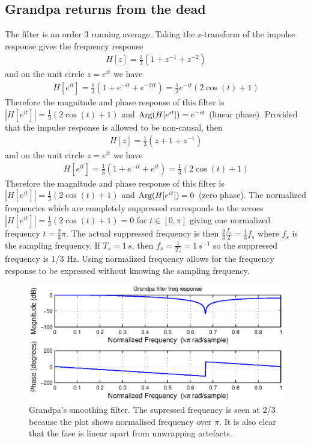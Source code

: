 \subsection{Grandpa returns from the dead}
The filter is an order 3 running average. Taking the z-transform of the impulse response gives the frequency response 
\begin{align*}
H[z] = \frac{1}{3}(1 + z^{-1} + z^{-2})
\end{align*}
and on the unit circle $z = e^{it}$ we have
\begin{align*}
H[e^{it}] = \frac{1}{3}(1 + e^{-it} + e^{-2it})=\frac{1}{3} e^{-it}(2\cos(t)+1)
\end{align*}
Therefore the magnitude and phase response of this filter is $|H[e^{it}]| = \frac{1}{3}(2\cos(t)+1)$ and $\textnormal{Arg}(H[e^{it}]) = e^{-it}$ (linear phase).
Provided that the impulse response is allowed to be non-causal, then
\begin{align*}
H[z] = \frac{1}{3}(z + 1 + z^{-1})
\end{align*}
and on the unit circle $z = e^{it}$ we have
\begin{align*}
H[e^{it}] = \frac{1}{3}(1 + e^{-it} + e^{it}) = \frac{1}{3}(2\cos(t)+1)
\end{align*}
Therefore the magnitude and phase response of this filter is $|H[e^{it}]| = \frac{1}{3}(2\cos(t)+1)$ and $\textnormal{Arg}(H[e^{it}]) = 0$ (zero phase). The normalized frequencies which are completely suppressed corresponds to the zeroes $|H[e^{it}]| = \frac{1}{3}(2\cos(t)+1) = 0$ for $t\in [0, \pi]$ giving one normalized frequency $t = \frac{2}{3}\pi$. The actual suppressed frequency is then $\frac{2}{3} \frac{f_s}{2} = \frac{1}{3} f_s$ where $f_s$ is the sampling frequency. If $T_s = 1 \, s$, then $f_s = \frac{1}{T_s} = 1 \, s^{-1}$ so the suppressed frequency is 1/3 Hz. Using normalized frequency allows for the frequency response to be expressed without knowing the sampling frequency.
\begin{figure}
	\center
	\includegraphics{./picture/ha9_3_2.eps}
	\caption{Grandpa's smoothing filter. The supressed frequency is seen at 2/3 because the plot shows normalised frequency over \(\pi\). It is also clear that the fase is linear apart from unwrapping artefacts.}
\end{figure}
